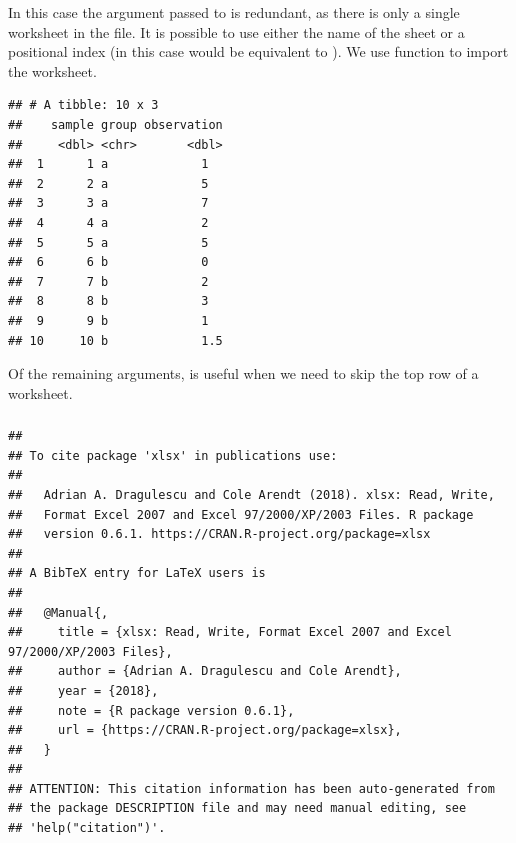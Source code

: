 \documentclass[krantz2]{krantz}\usepackage{knitr}%
\begin{document}
In this case the argument passed to  is redundant, as there is only a single worksheet in the file. It is possible to use either the name of the sheet or a positional index (in this case  would be equivalent to ). We use function  to import the worksheet.
\begin{knitrout}\footnotesize
{}\color{fgcolor}\begin{kframe}
\begin{alltt}
 \hlkwb{<-} \hlstd{(}\hlstd{,}  \hlstd{=} \hlstd{)}
\end{alltt}
\begin{verbatim}
## # A tibble: 10 x 3
##    sample group observation
##     <dbl> <chr>       <dbl>
##  1      1 a             1  
##  2      2 a             5  
##  3      3 a             7  
##  4      4 a             2  
##  5      5 a             5  
##  6      6 b             0  
##  7      7 b             2  
##  8      8 b             3  
##  9      9 b             1  
## 10     10 b             1.5
\end{verbatim}
\end{kframe}
\end{knitrout}

Of the remaining arguments,  is useful when we need to skip the top row of a worksheet.

\subsubsection['xlsx']{}

\begin{knitrout}\footnotesize
{}\color{fgcolor}\begin{kframe}
\begin{alltt}
\hlstd{(} \hlstd{=} \hlstd{)}
\end{alltt}
\begin{verbatim}
## 
## To cite package 'xlsx' in publications use:
## 
##   Adrian A. Dragulescu and Cole Arendt (2018). xlsx: Read, Write,
##   Format Excel 2007 and Excel 97/2000/XP/2003 Files. R package
##   version 0.6.1. https://CRAN.R-project.org/package=xlsx
## 
## A BibTeX entry for LaTeX users is
## 
##   @Manual{,
##     title = {xlsx: Read, Write, Format Excel 2007 and Excel 97/2000/XP/2003 Files},
##     author = {Adrian A. Dragulescu and Cole Arendt},
##     year = {2018},
##     note = {R package version 0.6.1},
##     url = {https://CRAN.R-project.org/package=xlsx},
##   }
## 
## ATTENTION: This citation information has been auto-generated from
## the package DESCRIPTION file and may need manual editing, see
## 'help("citation")'.
\end{verbatim}
\end{kframe}
\end{knitrout}
\end{document}
